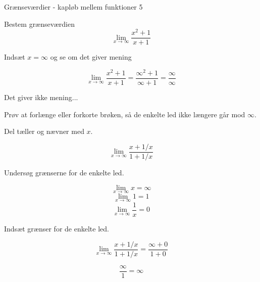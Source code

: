 \documentclass{article}
\begin{document}
\begin{exercise}{Grænseværdier - kapløb mellem funktioner 5}
	
	Bestem grænseværdien 
	\[
	\lim_{x \to \infty} \frac{x^2+1}{x + 1}
	\]
	
	
	\hint
	Indsæt $x=\infty$ og se om det giver mening
	
	\hint
	\[
	\lim_{x \to \infty} \frac{x^2+1}{x + 1} = \frac{\infty^2+1}{\infty+ 1} = \frac{\infty}{\infty}
	\]
	
	\hint
	Det giver ikke mening...
	
	\hint
	Prøv at forlænge eller forkorte brøken, så de enkelte led ikke længere går mod $\infty$. 
	
	\hint
	Del tæller og nævner med $x$. 
	
	\hint
	\[
	\lim_{x \to \infty} \frac{x+1/x}{1 + 1/x} 
	\]
	
	\hint
	Undersøg grænserne for de enkelte led.
	
	\hint
	\[
	\lim_{x \to \infty} x = \infty
	\]
	\[
	\lim_{x \to \infty} 1 = 1
	\]
	\[
	\lim_{x \to \infty} \frac{1}{x} = 0
	\]
	
	\hint 
	Indsæt grænser for de enkelte led.
	
	\hint
	\[
	\lim_{x \to \infty} \frac{x+1/x}{1 + 1/x}  = \frac{\infty + 0}{1 + 0} 
	\]
	
	\hint
	\[
	\frac{\infty}{1} = \infty
	\]
	
\end{exercise}
\newpage
\end{document}

